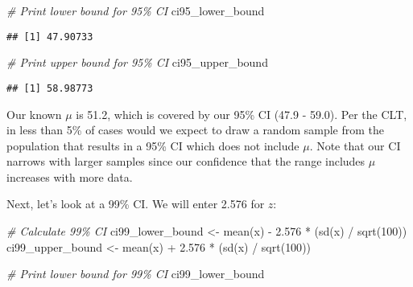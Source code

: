 \documentclass[
]{book}
\newenvironment{Shaded}{\begin{snugshade}}{\end{snugshade}}
\newcommand{\CommentTok}[1]{\textcolor[rgb]{0.56,0.35,0.01}{\textit{#1}}}
\newcommand{\DecValTok}[1]{\textcolor[rgb]{0.00,0.00,0.81}{#1}}
\newcommand{\FloatTok}[1]{\textcolor[rgb]{0.00,0.00,0.81}{#1}}
\newcommand{\FunctionTok}[1]{\textcolor[rgb]{0.00,0.00,0.00}{#1}}
\newcommand{\NormalTok}[1]{#1}
\newcommand{\OtherTok}[1]{\textcolor[rgb]{0.56,0.35,0.01}{#1}}
\newcommand{\SpecialCharTok}[1]{\textcolor[rgb]{0.00,0.00,0.00}{#1}}
\begin{document}
\begin{Shaded}
\begin{Highlighting}[]
\CommentTok{\# Print lower bound for 95\% CI}
\NormalTok{ci95\_lower\_bound}
\end{Highlighting}
\end{Shaded}

\begin{verbatim}
## [1] 47.90733
\end{verbatim}

\begin{Shaded}
\begin{Highlighting}[]
\CommentTok{\# Print upper bound for 95\% CI}
\NormalTok{ci95\_upper\_bound}
\end{Highlighting}
\end{Shaded}

\begin{verbatim}
## [1] 58.98773
\end{verbatim}

Our known \(\mu\) is 51.2, which is covered by our 95\% CI (47.9 - 59.0). Per the CLT, in less than 5\% of cases would we expect to draw a random sample from the population that results in a 95\% CI which does not include \(\mu\). Note that our CI narrows with larger samples since our confidence that the range includes \(\mu\) increases with more data.

Next, let's look at a 99\% CI. We will enter 2.576 for \(z\):

\begin{Shaded}
\begin{Highlighting}[]
\CommentTok{\# Calculate 99\% CI}
\NormalTok{ci99\_lower\_bound }\OtherTok{\textless{}{-}} \FunctionTok{mean}\NormalTok{(x) }\SpecialCharTok{{-}} \FloatTok{2.576} \SpecialCharTok{*}\NormalTok{ (}\FunctionTok{sd}\NormalTok{(x) }\SpecialCharTok{/} \FunctionTok{sqrt}\NormalTok{(}\DecValTok{100}\NormalTok{))}
\NormalTok{ci99\_upper\_bound }\OtherTok{\textless{}{-}} \FunctionTok{mean}\NormalTok{(x) }\SpecialCharTok{+} \FloatTok{2.576} \SpecialCharTok{*}\NormalTok{ (}\FunctionTok{sd}\NormalTok{(x) }\SpecialCharTok{/} \FunctionTok{sqrt}\NormalTok{(}\DecValTok{100}\NormalTok{))}
\end{Highlighting}
\end{Shaded}

\begin{Shaded}
\begin{Highlighting}[]
\CommentTok{\# Print lower bound for 99\% CI}
\NormalTok{ci99\_lower\_bound}
\end{Highlighting}
\end{Shaded}
\end{document}
